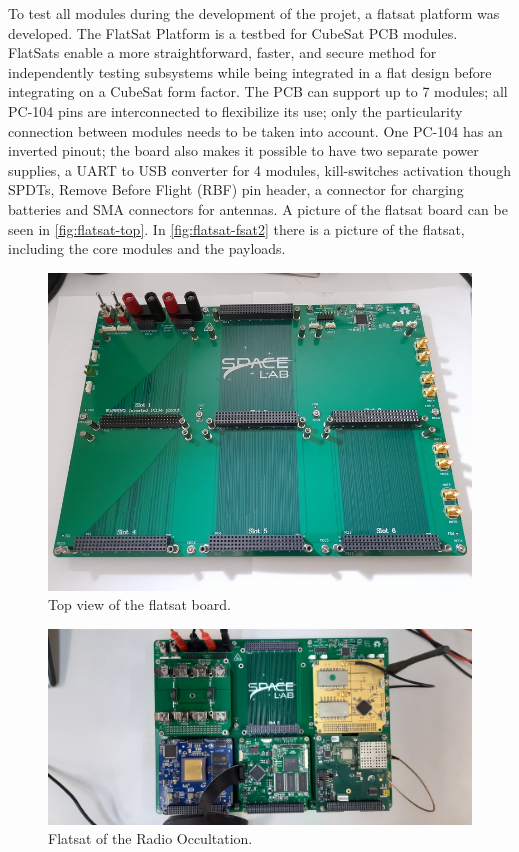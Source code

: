 To test all modules during the development of the projet, a flatsat platform was developed. The FlatSat Platform is a testbed for CubeSat PCB modules. FlatSats enable a more straightforward, faster, and secure method for independently testing subsystems while being integrated in a flat design before integrating on a CubeSat form factor. The PCB can support up to 7 modules; all PC-104 pins are interconnected to flexibilize its use; only the particularity connection between modules needs to be taken into account. One PC-104 has an inverted pinout; the board also makes it possible to have two separate power supplies, a UART to USB converter for 4 modules, kill-switches activation though SPDTs, Remove Before Flight (RBF) pin header, a connector for charging batteries and SMA connectors for antennas. A picture of the flatsat board can be seen in \autoref{fig:flatsat-top}. In \autoref{fig:flatsat-fsat2} there is a picture of the flatsat, including the core modules and the payloads.

\begin{figure}[!ht]
    \begin{center}
        \includegraphics[width=\textwidth]{figures/flatsat-top}
        \caption{Top view of the flatsat board.}
        \label{fig:flatsat-top}
    \end{center}
\end{figure}

\begin{figure}[!ht]
    \begin{center}
        \includegraphics[width=\textwidth]{figures/flatsat}
        \caption{Flatsat of the Radio Occultation.}
        \label{fig:flatsat-fsat2}
    \end{center}
\end{figure}

